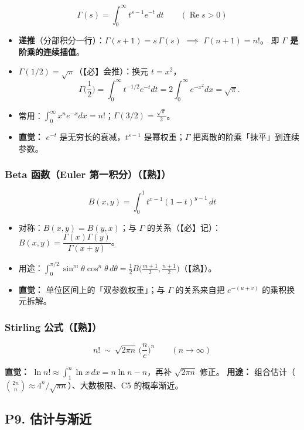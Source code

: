 \[
\Gamma(s)=\int_0^\infty t^{s-1}e^{-t}\,dt\qquad(\operatorname{Re}s>0)
\]

\begin{itemize}
  \item \textbf{递推}（分部积分一行）：$\Gamma(s+1)=s\,\Gamma(s)$ $\implies$ $\Gamma(n+1)=n!$。
        即 \textbf{$\Gamma$ 是阶乘的连续插值}。
  \item \textbf{$\Gamma(1/2)=\sqrt\pi$}（【必】会推）：换元 $t=x^2$，
        \[
        \Gamma\Big(\frac12\Big)=\int_0^\infty t^{-1/2}e^{-t}dt=2\int_0^\infty e^{-x^2}dx=\sqrt\pi.
        \]
  \item 常用：$\int_0^\infty x^n e^{-x}dx=n!$；$\Gamma(3/2)=\frac{\sqrt\pi}{2}$。
  \item \textbf{直觉：} $e^{-t}$ 是无穷长的衰减，$t^{s-1}$ 是幂权重；$\Gamma$ 把离散的阶乘「抹平」到连续参数。
\end{itemize}

\subsubsection{Beta 函数（Euler 第一积分）（【熟】）}

\[
B(x,y)=\int_0^1 t^{x-1}(1-t)^{y-1}\,dt
\]

\begin{itemize}
  \item 对称：$B(x,y)=B(y,x)$；与 $\Gamma$ 的关系（【必】记）：
        $B(x,y)=\dfrac{\Gamma(x)\Gamma(y)}{\Gamma(x+y)}$。
  \item 用途：$\displaystyle\int_0^{\pi/2}\sin^m\theta\cos^n\theta\,d\theta
        =\frac12 B\Big(\frac{m+1}{2},\frac{n+1}{2}\Big)$（【熟】）。
  \item \textbf{直觉：} 单位区间上的「双参数权重」；与 $\Gamma$ 的关系来自把 $e^{-(u+v)}$ 的乘积换元拆解。
\end{itemize}

\subsubsection{Stirling 公式（【熟】）}

\[
n!\ \sim\ \sqrt{2\pi n}\,\Big(\frac ne\Big)^n\qquad(n\to\infty)
\]

\textbf{直觉：} $\ln n!\approx\int_1^n\ln x\,dx=n\ln n-n$，再补 $\sqrt{2\pi n}$ 修正。
\textbf{用途：} 组合估计（$\binom{2n}{n}\approx 4^n/\sqrt{\pi n}$）、大数极限、C5 的概率渐近。

\subsection{P9. 估计与渐近}

